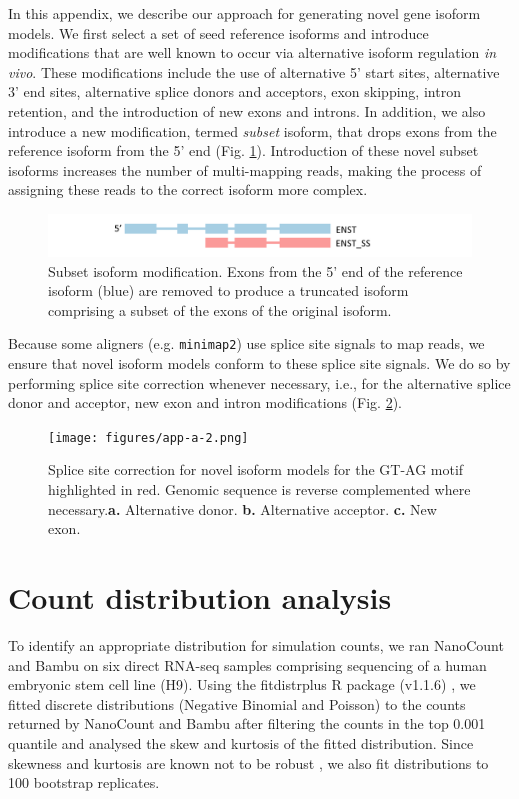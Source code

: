In this appendix, we describe our approach for generating novel gene isoform models. We first select a set of seed reference isoforms and introduce modifications that are well known to occur via alternative isoform regulation \textit{in vivo}. These modifications include the use of alternative 5' start sites, alternative 3' end sites, alternative splice donors and acceptors, exon skipping, intron retention, and the introduction of new exons and introns. In addition, we also introduce a new modification, termed \textit{subset} isoform, that drops exons from the reference isoform from the 5' end (Fig. \ref{fig:app-a-1}). Introduction of these novel subset isoforms increases the number of multi-mapping reads, making the process of assigning these reads to the correct isoform more complex. 
\begin{figure}[H]
    \centering
    \includegraphics[width=\textwidth]{figures/app-a-1.png}
    \caption[Subset isoform modification]{Subset isoform modification. Exons from the 5' end of the reference isoform (blue) are removed to produce a truncated isoform comprising a subset of the exons of the original isoform.}
    \label{fig:app-a-1}
\end{figure}
Because some aligners (e.g. \texttt{minimap2}) use splice site signals to map reads, we ensure that novel isoform models conform to these splice site signals. We do so by performing splice site correction whenever necessary, i.e., for the alternative splice donor and acceptor, new exon and intron modifications (Fig. \ref{fig:app-a-2}). 
\begin{figure}[H]
    \centering
    \texttt{[image: figures/app-a-2.png]}
    \caption[Splice site correction for novel isoform models]{Splice site correction for novel isoform models for the GT-AG motif highlighted in red. Genomic sequence is reverse complemented where necessary.\textbf{a.} Alternative donor. \textbf{b.} Alternative acceptor. \textbf{c.} New exon.}
    \label{fig:app-a-2}
\end{figure}

\chapter{Count distribution analysis}\label{ap:count-dist}

To identify an appropriate distribution for simulation counts, we ran NanoCount and Bambu on six direct RNA-seq samples comprising sequencing of a human embryonic stem cell line (H9). Using the fitdistrplus R package (v1.1.6) \cite{Delignette-Muller2015}, we fitted discrete distributions (Negative Binomial and Poisson) to the counts returned by NanoCount and Bambu after filtering the counts in the top 0.001 quantile and analysed the skew and kurtosis of the fitted distribution. Since skewness and kurtosis are known not to be robust \cite{Delignette-Muller2015}, we also fit distributions to 100 bootstrap replicates. 



